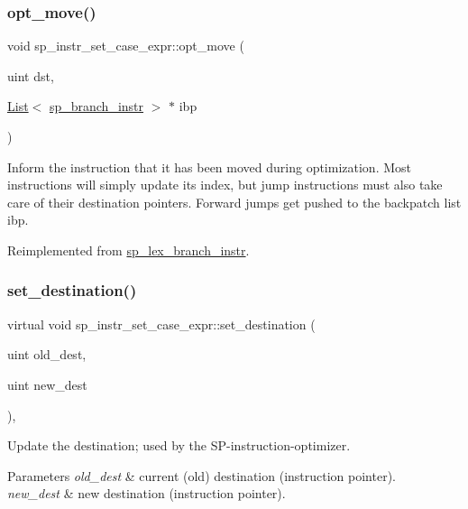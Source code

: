 \subsubsection{\texorpdfstring{opt\+\_\+move()}{opt\_move()}}
{\footnotesize\ttfamily void sp\+\_\+instr\+\_\+set\+\_\+case\+\_\+expr\+::opt\+\_\+move (\begin{DoxyParamCaption}\item[{uint}]{dst,  }\item[{\mbox{\hyperlink{classList}{List}}$<$ \mbox{\hyperlink{classsp__branch__instr}{sp\+\_\+branch\+\_\+instr}} $>$ $\ast$}]{ibp }\end{DoxyParamCaption})\hspace{0.3cm}{\ttfamily [virtual]}}

Inform the instruction that it has been moved during optimization. Most instructions will simply update its index, but jump instructions must also take care of their destination pointers. Forward jumps get pushed to the backpatch list \textquotesingle{}ibp\textquotesingle{}. 

Reimplemented from \mbox{\hyperlink{classsp__lex__branch__instr_ae7d74a74399102d85e481c4e46751cfe}{sp\+\_\+lex\+\_\+branch\+\_\+instr}}.

\mbox{\label{classsp__instr__set__case__expr_a7b2952b03aa0a30f407d88fd75ebdbae}} 
\subsubsection{\texorpdfstring{set\+\_\+destination()}{set\_destination()}}
{\footnotesize\ttfamily virtual void sp\+\_\+instr\+\_\+set\+\_\+case\+\_\+expr\+::set\+\_\+destination (\begin{DoxyParamCaption}\item[{uint}]{old\+\_\+dest,  }\item[{uint}]{new\+\_\+dest }\end{DoxyParamCaption})\hspace{0.3cm}{\ttfamily [inline]}, {\ttfamily [virtual]}}

Update the destination; used by the SP-\/instruction-\/optimizer.


\begin{DoxyParams}{Parameters}
{\em old\+\_\+dest} & current (old) destination (instruction pointer). \\
\hline
{\em new\+\_\+dest} & new destination (instruction pointer). \\
\hline
\end{DoxyParams}


